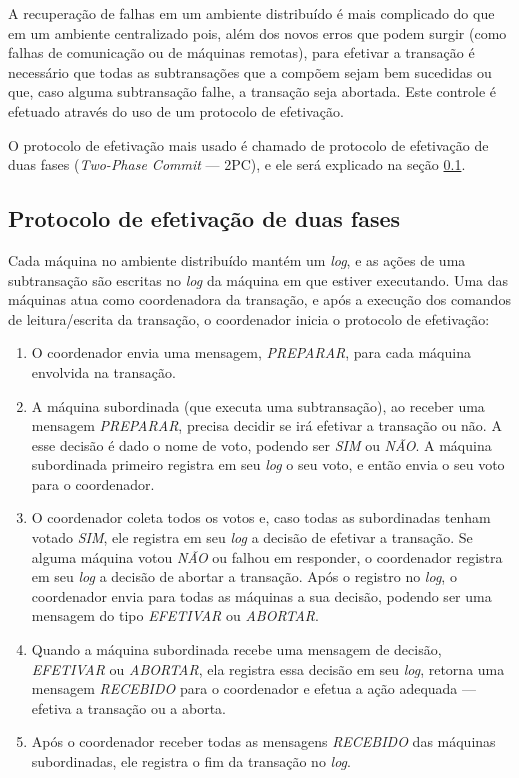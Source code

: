 \documentclass[11pt,twoside,a4paper]{book}
\begin{document}
A recuperação de falhas em um ambiente distribuído é mais complicado do que em um ambiente centralizado pois, além dos novos erros que podem surgir (como falhas de comunicação ou de máquinas remotas), para efetivar a transação é necessário que todas as subtransações que a compõem sejam bem sucedidas ou que, caso alguma subtransação falhe, a transação seja abortada. Este controle é efetuado através do uso de um protocolo de efetivação.

O protocolo de efetivação mais usado é chamado de protocolo de efetivação de duas fases (\emph{Two-Phase Commit} --- 2PC), e ele será explicado na seção \ref{subsec:2pc}.

\subsection{Protocolo de efetivação de duas fases}
\label{subsec:2pc}
Cada máquina no ambiente distribuído mantém um \emph{log}, e as ações de uma subtransação são escritas no \emph{log} da máquina em que estiver executando. Uma das máquinas atua como coordenadora da transação, e após a execução dos comandos de leitura/escrita da transação, o coordenador inicia o protocolo de efetivação:

\begin{enumerate}
\item O coordenador envia uma mensagem, \emph{PREPARAR}, para cada máquina envolvida na transação.
\item A máquina subordinada (que executa uma subtransação), ao receber uma mensagem \emph{PREPARAR}, precisa decidir se irá efetivar a transação ou não. A esse decisão é dado o nome de voto, podendo ser \emph{SIM} ou \emph{NÃO}. A máquina subordinada primeiro registra em seu \emph{log} o seu voto, e então envia o seu voto para o coordenador.
\item O coordenador coleta todos os votos e, caso todas as subordinadas tenham votado \emph{SIM}, ele registra em seu \emph{log} a decisão de efetivar a transação. Se alguma máquina votou \emph{NÃO} ou falhou em responder, o coordenador registra em seu \emph{log} a decisão de abortar a transação. Após o registro no \emph{log}, o coordenador envia para todas as máquinas a sua decisão, podendo ser uma mensagem do tipo \emph{EFETIVAR} ou \emph{ABORTAR}.
\item Quando a máquina subordinada recebe uma mensagem de decisão, \emph{EFETIVAR} ou \emph{ABORTAR}, ela registra essa decisão em seu \emph{log}, retorna uma mensagem \emph{RECEBIDO} para o coordenador e efetua a ação adequada --- efetiva a transação ou a aborta.
\item Após o coordenador receber todas as mensagens \emph{RECEBIDO} das máquinas subordinadas, ele registra o fim da transação no \emph{log}.
\end{enumerate}
\end{document}
